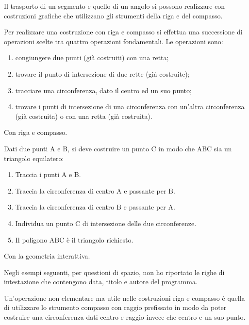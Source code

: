 Il trasporto di un segmento e quello di un angolo si possono realizzare con 
costruzioni grafiche che utilizzano gli strumenti della riga e del compasso.

Per realizzare una costruzione con riga e compasso si effettua una 
successione
di operazioni scelte tra quattro operazioni fondamentali. 
Le operazioni sono:
\begin{enumerate} [nosep]
  \item 
congiungere due punti (già costruiti) con una retta;
  \item 
trovare il punto di intersezione di due rette (già costruite);
  \item 
tracciare una circonferenza, dato il centro ed un suo punto;
  \item 
trovare i punti di intersezione di una circonferenza con un'altra 
circonferenza (già costruita) o con una retta (già costruita).
\end{enumerate}

Con riga e compasso.

\begin{procedura}\label{proc:fonda_equilatero}
  Dati due punti A e B, si deve costruire un punto C in modo che ABC sia un 
triangolo equilatero:
  \begin{enumerate} [nosep]
    \item 
    Traccia i punti A e B.
    \item 
    Traccia la circonferenza di centro A e passante per B.
    \item 
    Traccia la circonferenza di centro B e passante per A.
    \item 
    Individua un punto C di intersezione delle due circonferenze.
    \item 
    Il poligono ABC è il triangolo richiesto.    
  \end{enumerate}
\end{procedura}

\ifcoding
Con la geometria interattiva.
\begin{osservazione}
 Negli esempi seguenti, per questioni di spazio, non ho riportato le righe 
di 
intestazione che contengono data, titolo e autore del programma.
\end{osservazione}

\fi

Un'operazione non elementare ma utile nelle costruzioni riga e compasso è 
quella di utilizzare lo strumento compasso con raggio prefissato in modo da 
poter costruire una circonferenza dati centro e raggio invece che centro e 
un 
suo punto.

